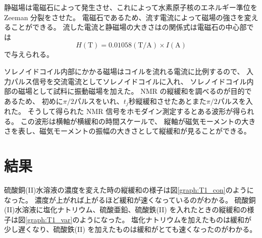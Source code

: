 \documentclass[11pt,dvipdfmx,a4paper]{jsarticle}
\begin{document}
静磁場は電磁石によって発生させ、これによって水素原子核のエネルギー準位を Zeeman 分裂をさせた。
電磁石であるため、流す電流によって磁場の強さを変えることができる。
流した電流と静磁場の大きさはの関係式は電磁石の中心部では
\begin{equation}
	H (\text{T}) = 0.01058 (\text{T/A}) \times I (\text{A})
\end{equation}
で与えられる。

ソレノイドコイル内部にかかる磁場はコイルを流れる電流に比例するので、
入力パルス信号を交流電流としてソレノイドコイルに入れ、
ソレノイドコイル内部の磁場として試料に振動磁場を加えた。
NMR の縦緩和を調べるのが目的であるため、
初めに\(\pi/2\)パルスをいれ、\(t_j\)秒縦緩和させたあとまた\(\pi/2\)パルスを入れた。
そうして得られた NMR 信号をホモダイン測定するとある波形が得られる。
この波形は横軸が横緩和の時間スケールで、
縦軸が磁気モーメントの大きさを表し、磁気モーメントの振幅の大きさとして縦緩和が見ることができる。

\section{結果}

硫酸銅(II)水溶液の濃度を変えた時の縦緩和の様子は図\ref{graph:T1_con}のようになった。
濃度が上がれば上がるほど緩和が速くなっているのがわかる。
硫酸銅(II)水溶液に塩化ナトリウム、硫酸亜鉛、硫酸鉄(II) を入れたときの縦緩和の様子は図\ref{graph:T1_var}のようになった。
塩化ナトリウムを加えたものは緩和が少し遅くなり、硫酸鉄(II) を加えたものは緩和がとても速くなったのがわかる。
\end{document}
